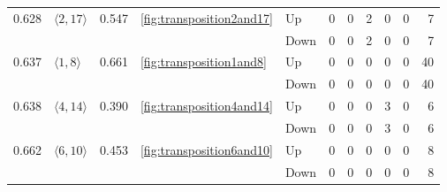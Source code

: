 \documentclass{article}
\begin{document}
\begin{center}
\begin{tabular}{lllllrrrrrr}
\cline{1-11} \cline{2-11} \cline{3-11} \cline{4-11}
\multirow[t]{2}{*}{0.628} & \multirow[t]{2}{*}{$\langle2, 17\rangle$} & \multirow[t]{2}{*}{0.547} & \multirow[t]{2}{*}{\ref{fig:transposition2and17}} & Up & 0 & 0 & 2 & 0 & 0 & 7 \\
 &  &  &  & Down & 0 & 0 & 2 & 0 & 0 & 7 \\
\cline{1-11} \cline{2-11} \cline{3-11} \cline{4-11}
\multirow[t]{2}{*}{0.637} & \multirow[t]{2}{*}{$\langle1, 8\rangle$} & \multirow[t]{2}{*}{0.661} & \multirow[t]{2}{*}{\ref{fig:transposition1and8}} & Up & 0 & 0 & 0 & 0 & 0 & 40 \\
 &  &  &  & Down & 0 & 0 & 0 & 0 & 0 & 40 \\
\cline{1-11} \cline{2-11} \cline{3-11} \cline{4-11}
\multirow[t]{2}{*}{0.638} & \multirow[t]{2}{*}{$\langle4, 14\rangle$} & \multirow[t]{2}{*}{0.390} & \multirow[t]{2}{*}{\ref{fig:transposition4and14}} & Up & 0 & 0 & 0 & 3 & 0 & 6 \\
 &  &  &  & Down & 0 & 0 & 0 & 3 & 0 & 6 \\
\cline{1-11} \cline{2-11} \cline{3-11} \cline{4-11}
\multirow[t]{2}{*}{0.662} & \multirow[t]{2}{*}{$\langle6, 10\rangle$} & \multirow[t]{2}{*}{0.453} & \multirow[t]{2}{*}{\ref{fig:transposition6and10}} & Up & 0 & 0 & 0 & 0 & 0 & 8 \\
 &  &  &  & Down & 0 & 0 & 0 & 0 & 0 & 8 \\
\cline{1-11} \cline{2-11} \cline{3-11} \cline{4-11}
\bottomrule
\end{tabular}


\end{center}
\end{document}

